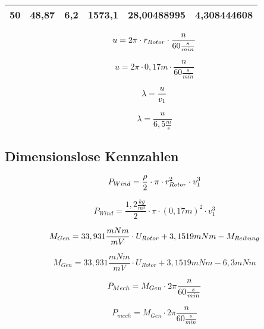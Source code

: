 \begin{table}[ht!]
\begin{tabular}{|l|l|l|l|l|l|}
    \rowcolor[HTML]{E2EFDA} 
    50                                    & 48,87                                  & 6,2                                                & 1573,1                                   & 28,00488995                                          & 4,308444608                                    \\ \hline
    \end{tabular}
    \end{table}

\begin{equation}
    \centering
    u = 2 \pi \cdot r_{Rotor} \cdot \frac{n}{60 \frac{s}{min}}
    \label{eq:230615_Umfangsgeschwindigkeit}
\end{equation}

$$    u = 2 \pi \cdot 0,17m \cdot \frac{n}{60 \frac{s}{min}} $$

\begin{equation}
    \centering
    \lambda = \frac{u}{v_1}
    \label{eq:230615_Schnelllaufzahl}
\end{equation}

$$\lambda = \frac{u}{6,5 \frac{m}{s}}$$


\subsection{Dimensionslose Kennzahlen}

\begin{equation}
    \centering
    P_{Wind} = \frac{\rho}{2} \cdot \pi \cdot r_{Rotor}^2 \cdot v_1^3
    \label{eq:230615_Leistung_Wind}
\end{equation}

$$P_{Wind} = \frac{1,2 \frac{kg}{m^3}}{2} \cdot \pi \cdot (0,17 m)^2 \cdot v_1^3$$

\begin{equation}
    \centering
    M_{Gen} = 33,931\frac{mNm}{mV} \cdot U_{Rotor} + 3,1519 mNm - M_{Reibung}
    \label{eq:230615_Genratormoment}
\end{equation}

$$M_{Gen} = 33,931\frac{mNm}{mV} \cdot U_{Rotor} + 3,1519 mNm - 6,3mNm$$

\begin{equation}
    \centering
    P_{Mech} = M_{Gen} \cdot 2 \pi \frac{n}{60\frac{s}{min}}
    \label{eq:230615_Mechanischeleistung}
\end{equation}

$$P_{mech} = M_{Gen} \cdot 2 \pi \frac{n}{60\frac{s}{min}}$$

